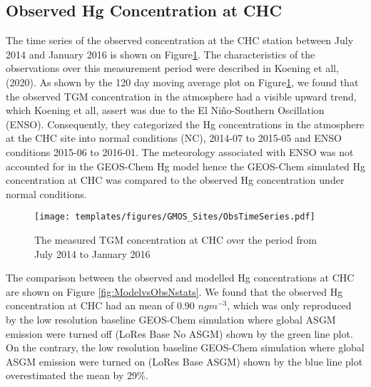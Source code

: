 \subsection{Observed Hg Concentration at CHC}
\begin{flushleft}
The time series of the observed concentration at the CHC station between July 2014 and January 2016 is shown on Figure\ref{fig:ObsTseries}. The characteristics of the observations over this measurement period were described in Koening et all,(2020). As shown by the 120 day moving average plot on Figure\ref{fig:ObsTseries}, we found that the observed TGM concentration in the atmosphere had a visible upward trend, which Koening et all, assert was due to the El Niño-Southern Oscillation (ENSO). Consequently, they categorized the Hg concentrations in the atmosphere at the CHC site into normal conditions (NC), 2014-07 to 2015-05 and ENSO conditions  2015-06 to 2016-01. The meteorology associated with ENSO was not accounted for in the GEOS-Chem Hg model hence the GEOS-Chem simulated Hg concentration at CHC was compared to the observed Hg concentration under normal conditions.
\end{flushleft}

\begin{figure}[H]
  \texttt{[image: templates/figures/GMOS\_Sites/ObsTimeSeries.pdf]}
 
  \caption{The measured TGM concentration at CHC over the period from July 2014 to January 2016}
  \label{fig:ObsTseries}
  \centering
\end{figure}
\FloatBarrier

\begin{flushleft}
 The comparison between the observed and modelled Hg concentrations at CHC are shown on Figure \ref{fig:ModelvsObsNstats}. We found that the observed Hg concentration at CHC had an mean of 0.90 $ngm^{-3}$, which was only reproduced by the low resolution baseline GEOS-Chem simulation where global ASGM emission were turned off (LoRes Base No ASGM) shown by the green line plot. On the contrary, the low resolution baseline GEOS-Chem simulation where global ASGM emission were turned on (LoRes Base ASGM) shown by the blue line plot overestimated the mean by 29\%.
\end{flushleft}


